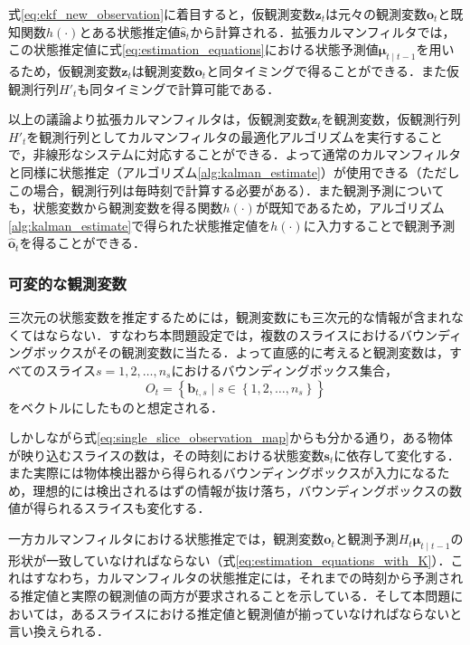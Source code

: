         式\ref{eq:ekf_new_observation}に着目すると，仮観測変数$\bm{z}_t$は元々の観測変数$\bm{o}_t$と既知関数$h(\cdot)$とある状態推定値$\hat{\bm{s}}_t$から計算される．拡張カルマンフィルタでは，この状態推定値に式\ref{eq:estimation_equations}における状態予測値$\bm{\mu}_{t\mid t-1}$を用いるため，仮観測変数$\bm{z}_t$は観測変数$\bm{o}_t$と同タイミングで得ることができる．また仮観測行列$H'_t$も同タイミングで計算可能である．

        以上の議論より拡張カルマンフィルタは，仮観測変数$\bm{z}_t$を観測変数，仮観測行列$H'_t$を観測行列としてカルマンフィルタの最適化アルゴリズムを実行することで，非線形なシステムに対応することができる．よって通常のカルマンフィルタと同様に状態推定（アルゴリズム\ref{alg:kalman_estimate}）が使用できる（ただしこの場合，観測行列は毎時刻で計算する必要がある）．また観測予測についても，状態変数から観測変数を得る関数$h(\cdot)$が既知であるため，アルゴリズム\ref{alg:kalman_estimate}で得られた状態推定値を$h(\cdot)$に入力することで観測予測$\hat{\bm{o}}_t$を得ることができる．
        
            \subsubsection{可変的な観測変数}

            三次元の状態変数を推定するためには，観測変数にも三次元的な情報が含まれなくてはならない．すなわち本問題設定では，複数のスライスにおけるバウンディングボックスがその観測変数に当たる．よって直感的に考えると観測変数は，すべてのスライス$s=1,2,\dots, n_s$におけるバウンディングボックス集合，
            \begin{equation}
                \label{eq:naive_skf_observation}
                    O_t = \left\{\bm{b}_{t, s} \mid s \in \left\{1, 2, \dots, n_s\right\}\right\}
            \end{equation}
            をベクトルにしたものと想定される．
            
            しかしながら式\ref{eq:single_slice_observation_map}からも分かる通り，ある物体が映り込むスライスの数は，その時刻における状態変数$\bm{s}_t$に依存して変化する．また実際には物体検出器から得られるバウンディングボックスが入力になるため，理想的には検出されるはずの情報が抜け落ち，バウンディングボックスの数値が得られるスライスも変化する．

            一方カルマンフィルタにおける状態推定では，観測変数$\bm{o}_t$と観測予測$H_t\bm{\mu}_{t \mid t-1}$の形状が一致していなければならない（式\ref{eq:estimation_equations_with_K}）．これはすなわち，カルマンフィルタの状態推定には，それまでの時刻から予測される推定値と実際の観測値の両方が要求されることを示している．そして本問題においては，あるスライスにおける推定値と観測値が揃っていなければならないと言い換えられる．

